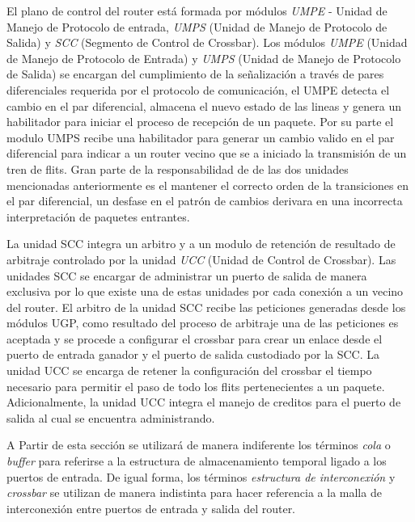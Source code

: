 El plano de control del router está formada por módulos \textit{UMPE} - Unidad de Manejo de Protocolo de entrada, \textit{UMPS} (Unidad de Manejo de Protocolo de Salida) y \textit{SCC} (Segmento de Control de Crossbar). Los módulos \textit{UMPE} (Unidad de Manejo de Protocolo de Entrada) y \textit{UMPS} (Unidad de Manejo de Protocolo de Salida) se encargan del cumplimiento de la señalización a través de pares diferenciales requerida por el protocolo de comunicación, el UMPE detecta el cambio en el par diferencial, almacena el nuevo estado de las lineas y genera un habilitador para iniciar el proceso de recepción de un paquete. Por su parte el modulo UMPS recibe una habilitador para generar un cambio valido en el par diferencial para indicar a un router vecino que se a iniciado la transmisión de un tren de flits. Gran parte de la responsabilidad de de las dos unidades mencionadas anteriormente es el mantener el correcto orden de la transiciones en el par diferencial, un desfase en el patrón de cambios derivara en una incorrecta interpretación de paquetes entrantes.

La unidad SCC integra un arbitro y a un modulo de retención de resultado de arbitraje controlado por la unidad \textit{UCC} (Unidad de Control de Crossbar). Las unidades SCC se encargar de administrar un puerto de salida de manera exclusiva por lo que existe una de estas unidades por cada conexión a un vecino del router. El arbitro de la unidad SCC recibe las peticiones generadas desde los módulos UGP, como resultado del proceso de arbitraje una de las peticiones es aceptada y se procede a configurar el crossbar para crear un enlace desde el puerto de entrada ganador y el puerto de salida custodiado por la SCC. La unidad UCC se encarga de retener la configuración del crossbar el tiempo necesario para permitir el paso de todo los flits pertenecientes a un paquete. Adicionalmente, la unidad UCC integra el manejo de creditos para el puerto de salida al cual se encuentra administrando.

A Partir de esta sección se utilizará de manera indiferente los términos \textit{cola} o \textit{buffer} para referirse a la estructura de almacenamiento temporal ligado a los puertos de entrada. De igual forma, los términos \textit{estructura de interconexión} y \textit{crossbar} se utilizan de manera indistinta para hacer referencia a la malla de interconexión entre puertos de entrada y salida del router.










